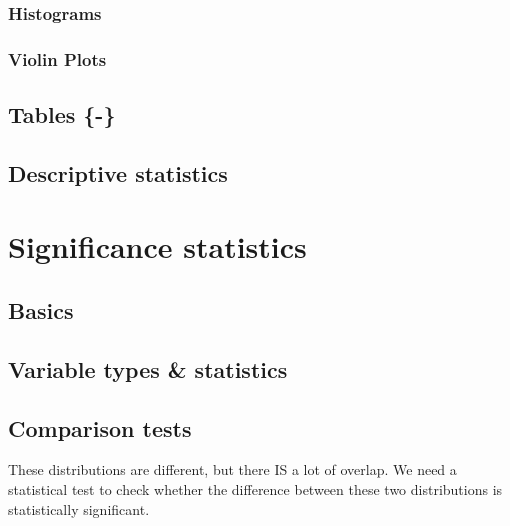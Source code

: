 \documentclass[
]{book}
\begin{document}
\hypertarget{histograms}{%
\subsection*{Histograms}\label{histograms}}

\hypertarget{violin-plots}{%
\subsection*{Violin Plots}\label{violin-plots}}

\hypertarget{tables}{%
\section{Tables \{-\}}\label{tables}}

\hypertarget{descriptive-statistics}{%
\section*{Descriptive statistics}\label{descriptive-statistics}}

\hypertarget{significance-statistics}{%
\chapter{Significance statistics}\label{significance-statistics}}

\hypertarget{basics}{%
\section{Basics}\label{basics}}

\hypertarget{variable-types-statistics}{%
\section{Variable types \& statistics}\label{variable-types-statistics}}

\hypertarget{comparison-tests}{%
\section{Comparison tests}\label{comparison-tests}}

These distributions are different, but there IS a lot of overlap. We need a statistical test to check whether the difference between these two distributions is statistically significant.
\end{document}

